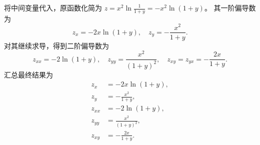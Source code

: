 \begin{solution}

    将中间变量代入，原函数化简为 $z = x^2 \ln \frac{1}{1+y} = -x^2 \ln(1+y)$。
    其一阶偏导数为
    \begin{equation}
        z_x = -2x \ln(1+y), \quad z_y = -\frac{x^2}{1+y}.
    \end{equation}
    对其继续求导，得到二阶偏导数为
    \begin{equation}
        z_{xx} = -2\ln(1+y), \quad z_{yy} = \frac{x^2}{(1+y)^2}, \quad z_{xy} = z_{yx} = -\frac{2x}{1+y}.
    \end{equation}
    汇总最终结果为
    \begin{equation}
        \boxed{
            \begin{aligned}
                z_x    & = -2x \ln(1+y),        \\
                z_y    & = -\frac{x^2}{1+y},    \\
                z_{xx} & = -2\ln(1+y),          \\
                z_{yy} & = \frac{x^2}{(1+y)^2}, \\
                z_{xy} & = -\frac{2x}{1+y}.
            \end{aligned}
        }
    \end{equation}



\end{solution}
